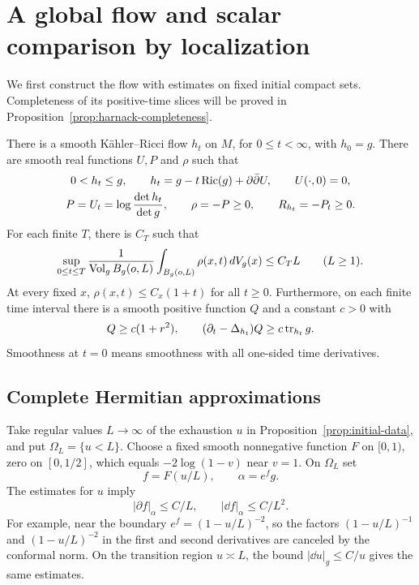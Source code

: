 \section{A global flow and scalar comparison by localization}
\label{sec:flow}

We first construct the flow with estimates on fixed initial compact
sets.  Completeness of its positive-time slices will be proved in
Proposition~\ref{prop:harnack-completeness}.

\begin{theorem}\label{thm:localized-flow}
There is a smooth K\"ahler--Ricci flow $h_t$ on $M$, for
$0\le t<\infty$, with $h_0=g$.  There are smooth real functions $U,P$
and $\rho$ such that
\begin{equation}\label{flow:identities}
 \begin{gathered}
 0<h_t\le g,\qquad
 h_t=g-t\operatorname{Ric}(g)+\partial\bar\partial U,\qquad U(\cdot,0)=0,\\
 P=U_t=\log\frac{\det h_t}{\det g},\qquad
 \rho=-P\ge0,\qquad R_{h_t}=-P_t\ge0.
 \end{gathered}
\end{equation}
For each finite $T$, there is $C_T$ such that
\begin{equation}\label{flow:rho-average}
 \sup_{0\le t\le T}
 \frac{1}{\operatorname{Vol}_gB_g(o,L)}\int_{B_g(o,L)}\rho(x,t)\,dV_g(x)
 \le C_TL\qquad(L\ge1).
\end{equation}
At every fixed $x$, $\rho(x,t)\le C_x(1+t)$ for all $t\ge0$.
Furthermore, on each finite time interval there is a smooth positive
function $Q$ and a constant $c>0$ with
\begin{equation}\label{flow:proper-supercaloric}
 Q\ge c(1+r^2),\qquad
 (\partial_t-\Delta_{h_t})Q\ge c\operatorname{tr}_{h_t}g.
\end{equation}
Smoothness at $t=0$ means smoothness with all one-sided time derivatives.
\end{theorem}

\subsection{Complete Hermitian approximations}

Take regular values $L\to\infty$ of the exhaustion $u$ in
Proposition~\ref{prop:initial-data}, and put $\Omega_L=\{u<L\}$.
Choose a fixed smooth nonnegative function $F$ on $[0,1)$, zero on
$[0,1/2]$, which equals $-2\log(1-v)$ near $v=1$.  On $\Omega_L$ set
\[
 f=F(u/L),\qquad \alpha=e^fg.
\]
The estimates for $u$ imply
\begin{equation}\label{flow:conformal-bounds}
 |\partial f|_\alpha\le C/L,
 \qquad |\dd f|_\alpha\le C/L^2.
\end{equation}
For example, near the boundary $e^f=(1-u/L)^{-2}$, so the factors
$(1-u/L)^{-1}$ and $(1-u/L)^{-2}$ in the first and second derivatives
are canceled by the conformal norm.  On the transition region
$u\asymp L$, the bound $|\dd u|_g\le C/u$ gives the same estimates.

